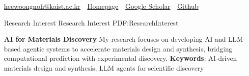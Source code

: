 \documentclass[letterpaper,MMMyyyy,nonstopmode]{simpleresumecv}
\newcommand{\CVAuthor}{Heewoong Noh}
\begin{document}

\Title{\CVAuthor}

\begin{SubTitle}
\par
\href{mailto:heewoongnoh@kaist.ac.kr}
{heewoongnoh@kaist.ac.kr}
\,\SubBulletSymbol\,
\href{https://heewoong-noh.github.io/}
{Homepage}
\,\SubBulletSymbol\,
\href{https://scholar.google.com/citations?user=VIAHsCMAAAAJ&hl=en}
{Google Scholar}
\,\SubBulletSymbol\,
\href{https://github.com/HeewoongNoh}
{Github}
\end{SubTitle}

\begin{Body}




\Section
{Research Interest}
{Research Interest}
{PDF:ResearchInterest}

\Entry
{\textbf{AI for Materials Discovery}}  
\newline
My research focuses on developing AI and LLM-based agentic systems to accelerate materials design and synthesis, bridging computational prediction with experimental discovery.
\BulletItem
\textbf{Keywords}: AI-driven materials design and synthesis,
LLM agents for scientific discovery









\end{Body}
\end{document}
